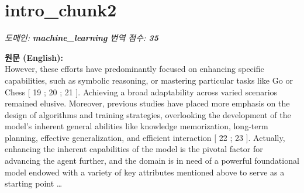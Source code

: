 \documentclass[12pt,a4paper]{article}
\begin{document}
\section{intro\_chunk2}
\noindent\textit{\small 도메인: \textbf{machine\_learning} \quad 번역 점수: \textbf{\color{red!70!black}35}}
\vspace{0.5em}

\begin{mdframed}[style=orig]
\noindent\textbf{\small 원문 (English):}\\[2pt]
\small However, these efforts have predominantly focused on enhancing specific capabilities, such as symbolic reasoning, or mastering particular tasks like Go or Chess [ 19 ; 20 ; 21 ]. Achieving a broad adaptability across varied scenarios remained elusive. Moreover, previous studies have placed more emphasis on the design of algorithms and training strategies, overlooking the development of the model’s inherent general abilities like knowledge memorization, long-term planning, effective generalization, and efficient interaction [ 22 ; 23 ]. Actually, enhancing the inherent capabilities of the model is the pivotal factor for advancing the agent further, and the domain is in need of a powerful foundational model endowed with a variety of key attributes mentioned above to serve as a starting point \ldots
\end{mdframed}
\vspace{0.4em}
\end{document}
